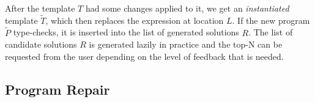 After the template $T$ had some changes applied to it, we get an
\emph{instantiated} template $\tilde{T}$, which then replaces the expression at
location $L$. If the new program $\tilde{P}$ type-checks, it is inserted into
the list of generated solutions $R$. The list of candidate solutions $R$ is
generated lazily in practice and the top-N can be requested from the user
depending on the level of feedback that is needed.


\subsection{Program Repair}
\label{subsec:repair}

